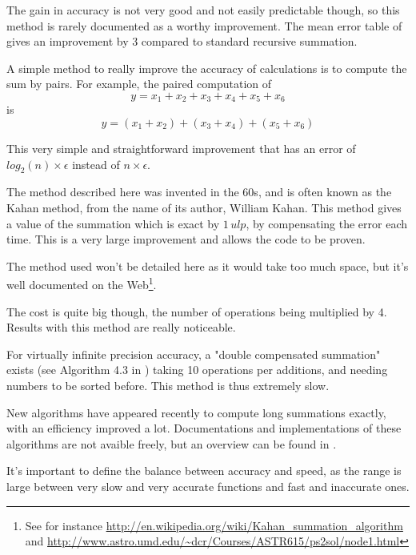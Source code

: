 The gain in accuracy is not very good and not easily predictable though, so this method is rarely documented as a worthy improvement. The mean error table of \cite{Higham} gives an improvement by 3 compared to standard recursive summation.


A simple method to really improve the accuracy of calculations is to compute the sum by pairs. For example, the paired computation of $$y=x_1+x_2+x_3+x_4+x_5+x_6$$ is $$y=(x_1+x_2)+(x_3+x_4)+(x_5+x_6)$$

This very simple and straightforward improvement that has an error of $log_2(n)\times\epsilon$ instead of $n\times\epsilon$.

\label{compensated}

The method described here was invented in the 60s, and is often known as the Kahan method, from the name of its author, William Kahan. This method gives a value of the summation which is exact by $1\,ulp$, by compensating the error each time. This is a very large improvement and allows the code to be proven.

The method used won't be detailed here as it would take too much space, but it's well documented on the Web\footnote{See for instance \url{http://en.wikipedia.org/wiki/Kahan_summation_algorithm} and \url{http://www.astro.umd.edu/~dcr/Courses/ASTR615/ps2sol/node1.html}}.

The cost is quite big though, the number of operations being multiplied by 4. Results with this method are really noticeable.

For virtually infinite precision accuracy, a "double compensated summation" exists (see Algorithm 4.3 in \cite{Higham}) taking 10 operations per additions, and needing numbers to be sorted before. This method is thus extremely slow.


New algorithms have appeared recently to compute long summations exactly, with an efficiency improved a lot. Documentations and implementations of these algorithms are not avaible freely, but an overview can be found in \cite{Langlois}\TODO . %


It's important to define the balance between accuracy and speed, as the range is large between very slow and very accurate functions and fast and inaccurate ones.

